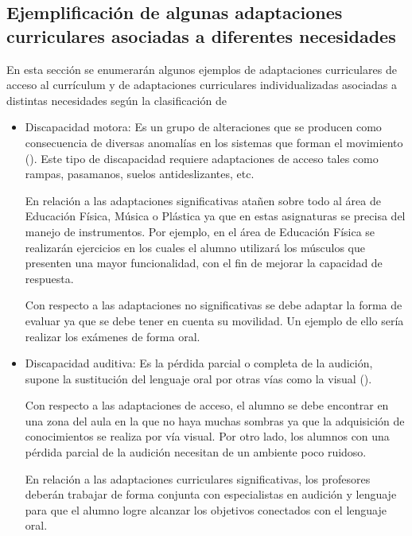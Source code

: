 \subsection{Ejemplificación de algunas adaptaciones curriculares asociadas a diferentes necesidades }

En esta sección se enumerarán algunos ejemplos de adaptaciones curriculares de acceso al currículum y de adaptaciones curriculares individualizadas asociadas a distintas necesidades según la clasificación de \citep*[Diseño y ejecución de planes, proyectos y adaptaciones curriculares para el tratamiento educativo de la diversidad]{adaptacionUNED}


\begin{itemize}
    \item Discapacidad motora: Es un grupo de alteraciones que se producen como consecuencia de diversas anomalías en los sistemas que forman el movimiento (\citeauthor{disMotora}). Este tipo de discapacidad requiere  adaptaciones de acceso tales como rampas, pasamanos, suelos antideslizantes, etc.

          En relación a las adaptaciones significativas atañen sobre todo al área de Educación Física, Música o Plástica ya que en estas asignaturas se precisa del manejo de instrumentos. Por ejemplo, en el área de Educación Física se realizarán ejercicios en los cuales el alumno utilizará los músculos que presenten una mayor funcionalidad, con el fin de mejorar la capacidad de respuesta.

          Con respecto a las adaptaciones no significativas se debe adaptar la forma de evaluar ya que se debe tener en cuenta su movilidad. Un ejemplo de ello sería realizar los exámenes de forma oral.

    \item Discapacidad auditiva: Es la pérdida parcial o completa de la audición, supone la sustitución del lenguaje oral por otras vías como la visual (\citeauthor{disAuditiva}).

          Con respecto a las adaptaciones de acceso, el alumno se debe encontrar en una zona del aula en la que no haya muchas sombras ya que la adquisición de conocimientos se realiza por vía visual. Por otro lado, los alumnos con una pérdida parcial de la audición necesitan de un ambiente poco ruidoso.

          En relación a las adaptaciones curriculares significativas, los profesores deberán trabajar de forma conjunta con especialistas en audición y lenguaje para que el alumno logre alcanzar los objetivos conectados con el lenguaje oral.


\end{itemize}
